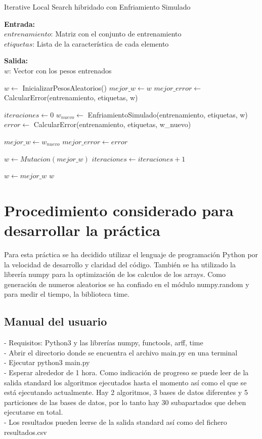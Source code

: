 \documentclass[12pt, spanish]{article}
\begin{document}
\begin{algorithm}[h]
  \caption{Iterative Local Search hibridado con Enfriamiento Simulado}
  \label{algorithm:ILS-ES}

  \textbf{Entrada:}\\
  $entrenamiento$: Matriz con el conjunto de entrenamiento\\
  $etiquetas$: Lista de la característica de cada elemento

  \textbf{Salida:}\\
  $w$: Vector con los pesos entrenados

  \begin{algorithmic}[1]
    \STATE $w \gets$ InicializarPesosAleatorios()
    \STATE $mejor\_w \gets w$
    \STATE $mejor\_error \gets$ CalcularError(entrenamiento, etiquetas, w)

    \STATE $iteraciones \gets 0$
      \STATE $w_{nuevo} \gets$ EnfriamientoSimulado(entrenamiento, etiquetas, w)
      \STATE $error \gets$ CalcularError(entrenamiento, etiquetas, w_{nuevo})

        \STATE $mejor\_w \gets w_{nuevo}$
        \STATE $mejor\_error \gets error$
      \ENDIF

      \STATE $w \gets Mutacion(mejor\_w)$
      \STATE $iteraciones \gets iteraciones + 1$
    \ENDWHILE

    \STATE $w \gets mejor\_w$
    \RETURN $w$

  \end{algorithmic}
\end{algorithm}
\pagebreak

\pagebreak

\section{Procedimiento considerado para desarrollar la práctica}
Para esta práctica se ha decidido utilizar el lenguaje de programación Python por la velocidad de desarrollo y claridad del código. También se ha utilizado la librería numpy para la optimización de los calculos de los arrays. Como generación de numeros aleatorios se ha confiado en el módulo numpy.random y para medir el tiempo, la biblioteca time.  
\subsection{Manual del usuario}
- Requisitos: Python3 y las librerías numpy, functools, arff, time \\
- Abrir el directorio donde se encuentra el archivo main.py en una terminal\\ 
- Ejecutar python3 main.py\\ 
- Esperar alrededor de 1 hora. Como indicación de progreso se puede leer de la salida standard los algoritmos ejecutados hasta el momento así como el que se está ejecutando actualmente. Hay 2 algoritmos, 3 bases de datos diferentes y 5 particiones de las bases de datos, por lo tanto hay 30 subapartados que deben ejecutarse en total.\\ 
- Los resultados pueden leerse de la salida standard así como del fichero resultados.csv\\
\end{document}
